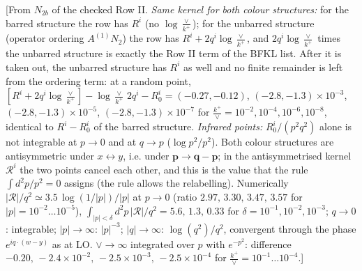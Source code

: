 \documentclass[9pt]{article}
\numberwithin{equation}{section}
\begin{document}
{\color{gray}\small [From $N_{2b}$ of the checked Row II. \emph{Same kernel for both colour structures:} for the barred structure the row has $R^{i}$ (no $\log\frac{\vee}{k^{+}}$); for the unbarred structure (operator ordering $A^{(1)}N_{2}$) the row has $R^{i}+2q^{i}\log\frac{\vee}{k^{+}}$, and $2q^{i}\log\frac{\vee}{k^{+}}$ times the unbarred structure is exactly the Row II term of the BFKL list. After it is taken out, the unbarred structure has $R^{i}$ as well and no finite remainder is left from the ordering term: at a random point, $[R^{i}+2q^{i}\log\frac{\vee}{k^{+}}]-\log\frac{\vee}{k^{+}}\,2q^{i}-R^{i}_{0}=(-0.27,-0.12)$, $(-2.8,-1.3)\times10^{-3}$, $(-2.8,-1.3)\times10^{-5}$, $(-2.8,-1.3)\times10^{-7}$ for $\frac{k^{+}}{\vee}=10^{-2},10^{-4},10^{-6},10^{-8}$, identical to $R^{i}-R^{i}_{0}$ of the barred structure. \emph{Infrared points:} $R^{i}_{0}/(p^{2}q^{2})$ alone is not integrable at $p\to0$ and at $q\to p$ ($\log p^{2}/p^{2}$). Both colour structures are antisymmetric under $x\leftrightarrow y$, i.e. under $\mathbf{p}\to\mathbf{q}-\mathbf{p}$; in the antisymmetrised kernel $\mathcal{R}^{i}$ the two points cancel each other, and this is the value that the rule $\int d^{2}p/p^{2}=0$ assigns (the rule allows the relabelling). Numerically $|\mathcal{R}|/q^{2}\simeq3.5\,\log(1/|p|)/|p|$ at $p\to0$ (ratio $2.97,\,3.30,\,3.47,\,3.57$ for $|p|=10^{-2}\dots10^{-5}$), $\int_{|p|<\delta}d^{2}p\,|\mathcal{R}|/q^{2}=5.6,\,1.3,\,0.33$ for $\delta=10^{-1},10^{-2},10^{-3}$; $q\to0$: integrable; $|p|\to\infty$: $|p|^{-3}$; $|q|\to\infty$: $\log(q^{2})/q^{2}$, convergent through the phase $e^{iq\cdot(w-y)}$ as at LO. $\vee\to\infty$ integrated over $p$ with $e^{-p^{2}}$: difference $-0.20,\,-2.4\times10^{-2},\,-2.5\times10^{-3},\,-2.5\times10^{-4}$ for $\frac{k^{+}}{\vee}=10^{-1}\dots10^{-4}$.]}
\end{document}
